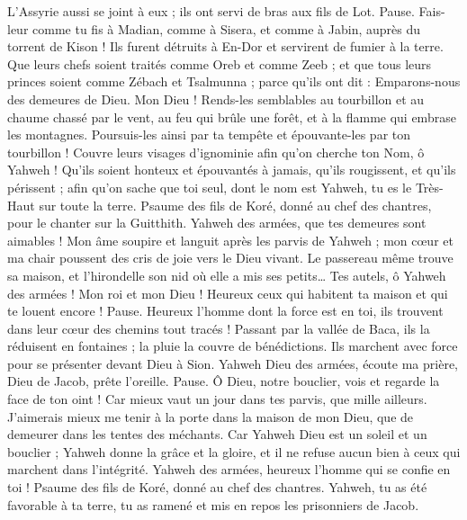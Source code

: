 \begin{multicols}{2}
L’Assyrie aussi se joint à eux ; ils ont servi de bras aux fils de Lot. Pause.
Fais-leur comme tu fis à Madian, comme à Sisera, et comme à Jabin, auprès du torrent de Kison !
Ils furent détruits à En-Dor et servirent de fumier à la terre.
Que leurs chefs soient traités comme Oreb et comme Zeeb ; et que tous leurs princes soient comme Zébach et Tsalmunna ;
parce qu'ils ont dit : Emparons-nous des demeures de Dieu.
Mon Dieu ! Rends-les semblables au tourbillon et au chaume chassé par le vent,
au feu qui brûle une forêt, et à la flamme qui embrase les montagnes.
Poursuis-les ainsi par ta tempête et épouvante-les par ton tourbillon !
Couvre leurs visages d'ignominie afin qu'on cherche ton Nom, ô Yahweh !
Qu'ils soient honteux et épouvantés à jamais, qu'ils rougissent, et qu'ils périssent ;
afin qu'on sache que toi seul, dont le nom est Yahweh, tu es le Très-Haut sur toute la terre.
\VerseOne{}Psaume des fils de Koré, donné au chef des chantres, pour le chanter sur la Guitthith.
Yahweh des armées, que tes demeures sont aimables !
Mon âme soupire et languit après les parvis de Yahweh ; mon cœur et ma chair poussent des cris de joie vers le Dieu vivant.
Le passereau même trouve sa maison, et l'hirondelle son nid où elle a mis ses petits… Tes autels, ô Yahweh des armées ! Mon roi et mon Dieu !
Heureux ceux qui habitent ta maison et qui te louent encore ! Pause.
Heureux l'homme dont la force est en toi, ils trouvent dans leur cœur des chemins tout tracés !
Passant par la vallée de Baca, ils la réduisent en fontaines ; la pluie la couvre de bénédictions.
Ils marchent avec force pour se présenter devant Dieu à Sion.
Yahweh Dieu des armées, écoute ma prière, Dieu de Jacob, prête l'oreille. Pause.
Ô Dieu, notre bouclier, vois et regarde la face de ton oint !
Car mieux vaut un jour dans tes parvis, que mille ailleurs. J'aimerais mieux me tenir à la porte dans la maison de mon Dieu, que de demeurer dans les tentes des méchants.
Car Yahweh Dieu est un soleil et un bouclier ; Yahweh donne la grâce et la gloire, et il ne refuse aucun bien à ceux qui marchent dans l'intégrité.
Yahweh des armées, heureux l'homme qui se confie en toi !
\VerseOne{}Psaume des fils de Koré, donné au chef des chantres.
Yahweh, tu as été favorable à ta terre, tu as ramené et mis en repos les prisonniers de Jacob.

\end{multicols}
